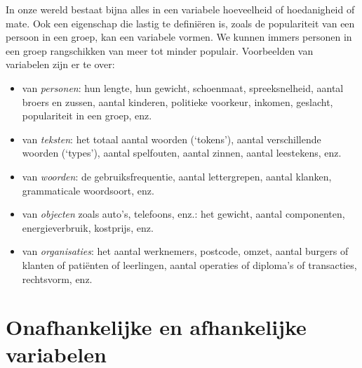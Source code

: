 \documentclass[
]{book}
\begin{document}
In onze wereld bestaat bijna alles in een variabele hoeveelheid of
hoedanigheid of mate. Ook een eigenschap die lastig te definiëren is,
zoals de populariteit van een persoon in een groep, kan een variabele
vormen. We kunnen immers personen in een groep rangschikken van meer tot
minder populair. Voorbeelden van variabelen zijn er te over:

\begin{itemize}
\item
  van \emph{personen}: hun lengte, hun gewicht, schoenmaat, spreeksnelheid,
  aantal broers en zussen, aantal kinderen, politieke voorkeur,
  inkomen, geslacht, populariteit in een groep, enz.
\item
  van \emph{teksten}: het totaal aantal woorden (`tokens'), aantal
  verschillende woorden (`types'), aantal spelfouten, aantal zinnen,
  aantal leestekens, enz.
\item
  van \emph{woorden}: de gebruiksfrequentie, aantal lettergrepen, aantal
  klanken, grammaticale woordsoort, enz.
\item
  van \emph{objecten} zoals auto's, telefoons, enz.: het gewicht, aantal
  componenten, energieverbruik, kostprijs, enz.
\item
  van \emph{organisaties}: het aantal werknemers, postcode, omzet, aantal
  burgers of klanten of patiënten of leerlingen, aantal operaties of
  diploma's of transacties, rechtsvorm, enz.
\end{itemize}

\section{Onafhankelijke en afhankelijke variabelen}\label{sec:onafhankelijkeafhankelijkevariabelen}
\end{document}
